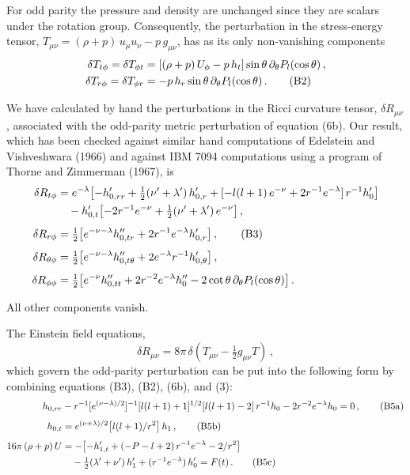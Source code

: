 
For odd parity the pressure and density are unchanged since they are scalars under the rotation
group. Consequently, the perturbation in the stress-energy tensor,
$T_{\mu\nu} = (\rho + p)\,u_\mu u_\nu - p\,g_{\mu\nu}$,
has as its only non-vanishing components
%
\begin{align}
\delta T_{t\phi} = \delta T_{\phi t} &= [(\rho+p)\,U_\phi - p\,h_t]
    \sin\theta\,\partial_\theta P_l(\cos\theta) \,, \notag \\
\delta T_{r\phi} = \delta T_{\phi r} &= -p\,h_r
    \sin\theta\,\partial_\theta P_l(\cos\theta) \,.
\tag{B2}
\end{align}

We have calculated by hand the perturbations in the Ricci curvature tensor, $\delta R_{\mu\nu}$,
associated with the odd-parity metric perturbation of equation (6b). Our result, which has been checked
against similar hand computations of Edelstein and Vishveshwara (1966) and against IBM 7094
computations using a program of Thorne and Zimmerman (1967), is
%
\begin{align}
\delta R_{t\phi} &=
    e^{-\lambda}\bigl[{-h_{0,rr}'} + \tfrac{1}{2}(\nu'+\lambda')\,h_{0,r}'
    + [-l(l+1)\,e^{-\nu} + 2r^{-1}e^{-\lambda}]\,r^{-1}h_0'\bigr]
\notag \\
&\quad
    - h_{0,t}'\bigl[-2r^{-1}e^{-\nu} + \tfrac{1}{2}(\nu'+\lambda')\,e^{-\nu}\bigr] \,,
\notag \\[4pt]
\delta R_{r\phi} &=
    \tfrac{1}{2}\bigl[e^{-\nu-\lambda}h_{0,tr}'' + 2r^{-1}e^{-\lambda}h_{0,r}'\bigr] \,,
\tag{B3} \\[4pt]
\delta R_{\theta\phi} &=
    \tfrac{1}{2}\bigl[e^{-\nu-\lambda}h_{0,t\theta}'' + 2e^{-\lambda}r^{-1}h_{0,\theta}'\bigr] \,,
\notag \\[4pt]
\delta R_{\phi\phi} &=
    \tfrac{1}{2}\bigl[e^{-\nu}h_{0,tt}'' + 2r^{-2}e^{-\lambda}h_0''
    - 2\cot\theta\,\partial_\theta P_l(\cos\theta)\bigr] \,.
\notag
\end{align}

All other components vanish.

The Einstein field equations,
%
\begin{equation}
\delta R_{\mu\nu} = 8\pi\,\delta\!\left(T_{\mu\nu} - \tfrac{1}{2}g_{\mu\nu}T\right) \,,
\tag{B4}
\end{equation}
%
which govern the odd-parity perturbation can be put into the following form by combining
equations (B3), (B2), (6b), and (3):
%
\begin{align}
h_{0,rr} &- r^{-1}[e^{(\nu-\lambda)/2}]^{-1}[l(l+1)+1]^{1/2}[l(l+1)-2]\,r^{-1}h_0
    - 2r^{-2}e^{-\lambda}h_0 = 0 \,,
\tag{B5a} \\[4pt]
h_{0,t} &= e^{(\nu+\lambda)/2}\bigl[l(l+1)/r^2\bigr]\,h_1 \,,
\tag{B5b} \\[4pt]
16\pi\,(\rho+p)\,U &=
    -\bigl[{-h_{1,t}'} + (-P-l+2)\,r^{-1}e^{-\lambda} - 2/r^2\bigr]
\notag \\
&\quad
    - \tfrac{1}{2}(\lambda'+\nu')\,h_1'
    + (r^{-1}e^{-\lambda})\,h_0' = F(t) \,.
\tag{B5c}
\end{align}


